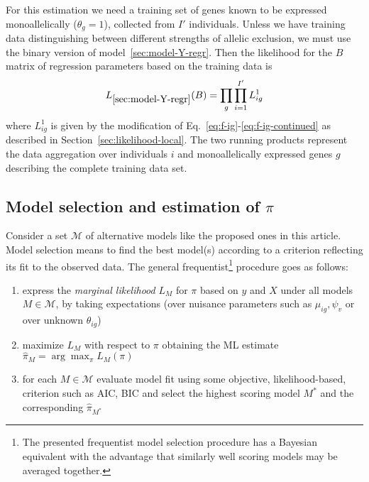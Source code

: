 \documentclass[letterpaper]{article}
\begin{document}
For this estimation we need a training set of genes known to be expressed
monoallelically (\(\theta_g=1\)), collected
from \(I'\) individuals.  Unless we have training data distinguishing between
different strengths of allelic exclusion, we must use the binary version of
model~\ref{sec:model-Y-regr}.  Then the likelihood for the \(B\) matrix of regression
parameters based on the training data is
\begin{eqnarray}
L_{\ref{sec:model-Y-regr}}(B) = \prod_{g} \prod_{i=1}^{I'} L_{ig}^1
\end{eqnarray}
where \(L_{ig}^1\) is given by the modification of
Eq.~\ref{eq:f-ig}-\ref{eq:f-ig-continued} as described in
Section~\ref{sec:likelihood-local}.  The two running products represent the
data aggregation over individuals \(i\) and monoallelically expressed genes
\(g\) describing the complete training data set.

\subsection{Model selection and estimation of \(\pi\)}
\label{sec:model-selection}

Consider a set \(\mathcal{M}\) of alternative models like the proposed ones in
this article.  Model selection means to find the best model(s) according to a
criterion reflecting its fit to the observed data.
The general frequentist\footnote{The presented frequentist model selection
procedure has a Bayesian
equivalent with the advantage that similarly well scoring models may be
averaged together. } procedure goes as follows:
\begin{enumerate}
\item
express the \emph{marginal likelihood} \(L_M\) for \(\pi\) based on \(y\)
and \(X\) under all models \(M\in \mathcal{M}\), by taking expectations (over nuisance
parameters such as \(\mu_{ig},\psi_v\) or over unknown \(\theta_{ig}\))
\item 
maximize \(L_M\) with respect to \(\pi\) obtaining the ML estimate
\(\hat{\pi}_M=\arg\max_\pi L_{M}(\pi)\)
\item for each \(M\in\mathcal{M}\) evaluate model fit using some objective,
likelihood-based, criterion such as AIC, BIC and select the highest scoring model
\(M^*\) and the corresponding \(\hat{\pi}_{M^*}\)
\end{enumerate}
\end{document}
